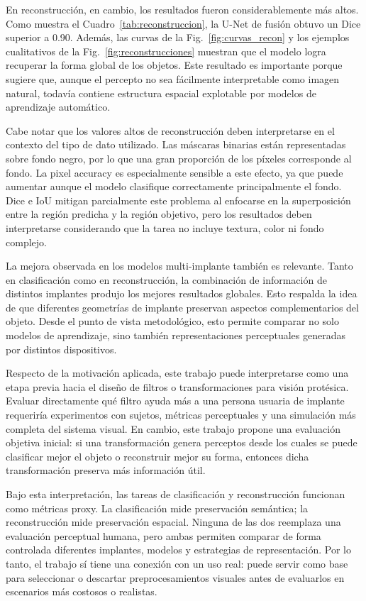 \documentclass[conference,a4paper]{IEEEtran}
\begin{document}
En reconstrucción, en cambio, los resultados fueron considerablemente más altos. Como muestra el Cuadro~\ref{tab:reconstruccion}, la U-Net de fusión obtuvo un Dice superior a 0.90. Además, las curvas de la Fig.~\ref{fig:curvas_recon} y los ejemplos cualitativos de la Fig.~\ref{fig:reconstrucciones} muestran que el modelo logra recuperar la forma global de los objetos. Este resultado es importante porque sugiere que, aunque el percepto no sea fácilmente interpretable como imagen natural, todavía contiene estructura espacial explotable por modelos de aprendizaje automático.

Cabe notar que los valores altos de reconstrucción deben interpretarse en el contexto del tipo de dato utilizado. Las máscaras binarias están representadas sobre fondo negro, por lo que una gran proporción de los píxeles corresponde al fondo. La pixel accuracy es especialmente sensible a este efecto, ya que puede aumentar aunque el modelo clasifique correctamente principalmente el fondo. Dice e IoU mitigan parcialmente este problema al enfocarse en la superposición entre la región predicha y la región objetivo, pero los resultados deben interpretarse considerando que la tarea no incluye textura, color ni fondo complejo.

La mejora observada en los modelos multi-implante también es relevante. Tanto en clasificación como en reconstrucción, la combinación de información de distintos implantes produjo los mejores resultados globales. Esto respalda la idea de que diferentes geometrías de implante preservan aspectos complementarios del objeto. Desde el punto de vista metodológico, esto permite comparar no solo modelos de aprendizaje, sino también representaciones perceptuales generadas por distintos dispositivos.

Respecto de la motivación aplicada, este trabajo puede interpretarse como una etapa previa hacia el diseño de filtros o transformaciones para visión protésica. Evaluar directamente qué filtro ayuda más a una persona usuaria de implante requeriría experimentos con sujetos, métricas perceptuales y una simulación más completa del sistema visual. En cambio, este trabajo propone una evaluación objetiva inicial: si una transformación genera perceptos desde los cuales se puede clasificar mejor el objeto o reconstruir mejor su forma, entonces dicha transformación preserva más información útil.

Bajo esta interpretación, las tareas de clasificación y reconstrucción funcionan como métricas proxy. La clasificación mide preservación semántica; la reconstrucción mide preservación espacial. Ninguna de las dos reemplaza una evaluación perceptual humana, pero ambas permiten comparar de forma controlada diferentes implantes, modelos y estrategias de representación. Por lo tanto, el trabajo sí tiene una conexión con un uso real: puede servir como base para seleccionar o descartar preprocesamientos visuales antes de evaluarlos en escenarios más costosos o realistas.
\end{document}
